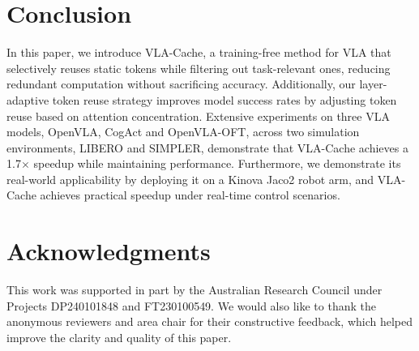 \section{Conclusion} 
\label{sec:conclusion}
In this paper, we introduce VLA-Cache, a training-free method for VLA that selectively reuses static tokens while filtering out task-relevant ones, reducing redundant computation without sacrificing accuracy. Additionally, our layer-adaptive token reuse strategy improves model success rates by adjusting token reuse based on attention concentration. Extensive experiments on three VLA models, OpenVLA, CogAct and OpenVLA-OFT, across two simulation environments, LIBERO and SIMPLER, demonstrate that VLA-Cache achieves a 1.7$\times$ speedup while maintaining performance. Furthermore, we demonstrate its real-world applicability by deploying it on a Kinova Jaco2 robot arm, and VLA-Cache achieves practical speedup under real-time control scenarios.

\section*{Acknowledgments}

This work was supported in part by the Australian Research Council under Projects DP240101848 and FT230100549. We would also like to thank the anonymous reviewers and area chair for their constructive feedback, which helped improve the clarity and quality of this paper.